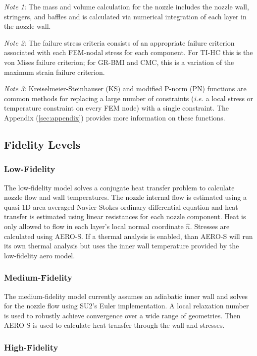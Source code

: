 \documentclass{article}
\begin{document}
\textit{Note 1:} The mass and volume calculation for the nozzle includes the nozzle wall, stringers, and baffles and is calculated via numerical integration of each layer in the nozzle wall.

\textit{Note 2:} The failure stress criteria consists of an appropriate failure criterion associated with each FEM-nodal stress for each component. For TI-HC this is the von Mises failure criterion; for GR-BMI and CMC, this is a variation of the maximum strain failure criterion.

\textit{Note 3:} Kreiselmeier-Steinhauser (KS) and modified P-norm (PN) functions are common methods for replacing a large number of constraints (\textit{i.e.} a local stress or temperature constraint on every FEM node) with a single constraint. The Appendix (\ref{sec:appendix}) provides more information on these functions.

\subsection{Fidelity Levels}

\subsubsection{Low-Fidelity}

The low-fidelity model solves a conjugate heat transfer problem to calculate nozzle flow and wall temperatures. The nozzle internal flow is estimated using a quasi-1D area-averaged Navier-Stokes ordinary differential equation and heat transfer is estimated using linear resistances for each nozzle component. Heat is only allowed to flow in each layer's local normal coordinate $\hat{n}$. Stresses are calculated using AERO-S. If a thermal analysis is enabled, than AERO-S will run its own thermal analysis but uses the inner wall temperature provided by the low-fidelity aero model.

\subsubsection{Medium-Fidelity}

The medium-fidelity model currently assumes an adiabatic inner wall and solves for the nozzle flow using SU2's Euler implementation. A local relaxation number is used to robustly achieve convergence over a wide range of geometries. Then AERO-S is used to calculate heat transfer through the wall and stresses. 

\subsubsection{High-Fidelity}
\end{document}
